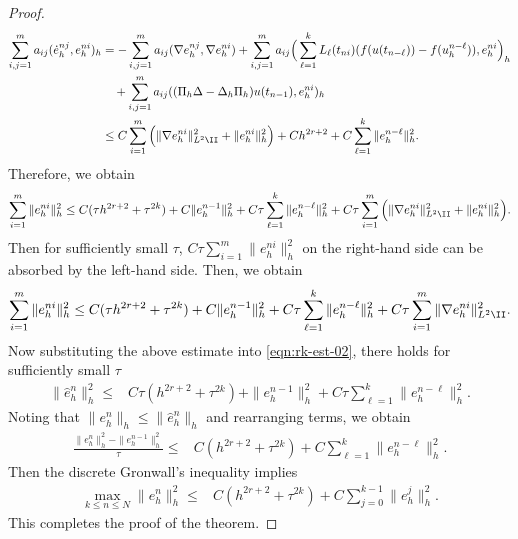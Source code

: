 \begin{proof}
\begin{equation*}
\begin{split}
 \sum_{i,j=1}^m a_{ij}(\dot e_h^{nj},e_h^{ni})_h &= - \sum_{i,j=1}^m a_{ij}(\nabla e_h^{nj}, \nabla e_h^{ni})
 + \sum_{i,j=1}^m a_{ij}   \Big( \sum_{\ell=1}^k L_{\ell}(t_{ni})   (f(u(t_{n-\ell})) - f(u_h^{n-\ell})) , e_h^{ni}\Big)_h\\
&\quad + \sum_{i,j=1}^m a_{ij}  ((\Pi_h \Delta - \Delta_h \Pi_h) u(t_{n-1}),  e_h^{ni} )_h \\
&\le C\sum_{i=1}^m \Big(\| \nabla e_h^{ni}  \|_{L^2\II}^2 + \|  e_h^{ni}  \|_{h}^2  \Big)+ Ch^{2r+2} + C\sum_{\ell=1}^k \| e_h^{n-\ell} \|_h^2.
\end{split}
\end{equation*}
Therefore, we obtain
\begin{equation*}
\begin{split}
 \sum_{i=1}^m \|e_h^{ni}\|_h^2   \le  C( \tau h^{2r+2}+\tau^{2k}) + C\|  e_h^{n-1} \|_h^2 + C\tau \sum_{\ell=1}^k \| e_h^{n-\ell} \|_h^2 +
 C\tau \sum_{i=1}^m \Big(\| \nabla e_h^{ni}  \|_{L^2\II}^2 + \|  e_h^{ni}  \|_{h}^2   \Big).
\end{split}
\end{equation*}
Then for sufficiently small $\tau$,
$ C\tau \sum_{i=1}^m \|e_h^{ni}\|_h^2   $
on the right-hand side can be absorbed by the left-hand side. Then, we obtain
\begin{equation*}
\begin{split}
 \sum_{i=1}^m \|e_h^{ni}\|_h^2   \le  C( \tau h^{2r+2}+\tau^{2k}) + C\|  e_h^{n-1} \|_h^2 + C\tau \sum_{\ell=1}^k \| e_h^{n-\ell} \|_h^2 +
 C\tau \sum_{i=1}^m \| \nabla e_h^{ni}  \|_{L^2\II}^2 .
\end{split}
\end{equation*}
Now substituting the above estimate into \eqref{eqn:rk-est-02}, there holds for sufficiently small $\tau$
\begin{equation*}
\begin{split}
 \|\hat e_h^{n}\|_h^2
 \le&  C\tau(h^{2r+2}+ \tau^{2k}) +  \|e_h^{n-1}\|_h^2   + C\tau  \sum_{\ell=1}^{k} \|  e_h^{n-\ell} \|_h^2.
\end{split}
\end{equation*}
Noting that  $\|e_h^{n}\|_h \le  \|\hat e_h^{n}\|_h$ and rearranging terms, we obtain
\begin{equation*}
\begin{split}
 \frac{\|e_h^{n}\|_h^2 - \|e_h^{n-1}\|_h^2}{\tau}
 \le&  C (h^{2r+2}+ \tau^{2k})   + C \sum_{\ell=1}^{k} \|  e_h^{n-\ell} \|_h^2.
\end{split}
\end{equation*}
Then the discrete Gronwall's inequality implies
\begin{equation*}
\begin{split}
\max_{k \le n\le N}  \|e_h^{n}\|_h^2
 \le&  C (h^{2r+2}+ \tau^{2k})  +  C \sum_{j=0}^{k-1} \|  e_h^{j} \|_h^2.
\end{split}
\end{equation*}
This completes the proof of the theorem.
\end{proof}

